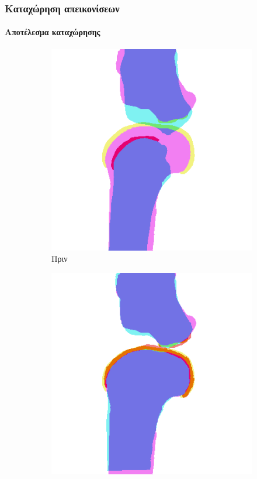 \documentclass{beamer}
\begin{document}
\begin{frame}
\frametitle{Καταχώρηση απεικονίσεων}
\framesubtitle{Αποτέλεσμα καταχώρησης}

\begin{figure}[H]
    \centering

    \begin{subfigure}[t]{0.24\linewidth}
    \includegraphics[width=\linewidth]{combination_label_before_registration_1.png}
    \caption{Πριν}
    \end{subfigure}
    \begin{subfigure}[t]{0.24\linewidth}
    \includegraphics[width=\linewidth]{combination_label_after_registration_1.png}

\end{subfigure}
\end{figure}
\end{frame}
\end{document}
